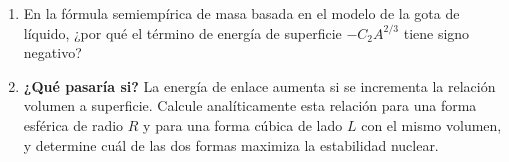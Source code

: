 \item \begin{enumerate}
    \item En la fórmula semiempírica de masa basada en el modelo de la gota de líquido, ¿por qué el término de energía de superficie $-C_2 A^{2/3}$ tiene signo negativo?
    \item \textbf{¿Qué pasaría si?} La energía de enlace aumenta si se incrementa la relación volumen a superficie. Calcule analíticamente esta relación para una forma esférica de radio $R$ y para una forma cúbica de lado $L$ con el mismo volumen, y determine cuál de las dos formas maximiza la estabilidad nuclear.
\end{enumerate}